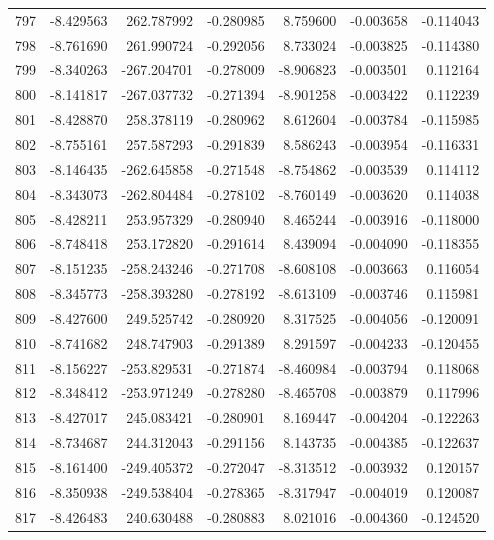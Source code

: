 \begin{tabular}{rrrrrrr}
 797 &  -8.429563 &  262.787992 & -0.280985 &    8.759600 &   -0.003658 & -0.114043 \\
 798 &  -8.761690 &  261.990724 & -0.292056 &    8.733024 &   -0.003825 & -0.114380 \\
 799 &  -8.340263 & -267.204701 & -0.278009 &   -8.906823 &   -0.003501 &  0.112164 \\
 800 &  -8.141817 & -267.037732 & -0.271394 &   -8.901258 &   -0.003422 &  0.112239 \\
 801 &  -8.428870 &  258.378119 & -0.280962 &    8.612604 &   -0.003784 & -0.115985 \\
 802 &  -8.755161 &  257.587293 & -0.291839 &    8.586243 &   -0.003954 & -0.116331 \\
 803 &  -8.146435 & -262.645858 & -0.271548 &   -8.754862 &   -0.003539 &  0.114112 \\
 804 &  -8.343073 & -262.804484 & -0.278102 &   -8.760149 &   -0.003620 &  0.114038 \\
 805 &  -8.428211 &  253.957329 & -0.280940 &    8.465244 &   -0.003916 & -0.118000 \\
 806 &  -8.748418 &  253.172820 & -0.291614 &    8.439094 &   -0.004090 & -0.118355 \\
 807 &  -8.151235 & -258.243246 & -0.271708 &   -8.608108 &   -0.003663 &  0.116054 \\
 808 &  -8.345773 & -258.393280 & -0.278192 &   -8.613109 &   -0.003746 &  0.115981 \\
 809 &  -8.427600 &  249.525742 & -0.280920 &    8.317525 &   -0.004056 & -0.120091 \\
 810 &  -8.741682 &  248.747903 & -0.291389 &    8.291597 &   -0.004233 & -0.120455 \\
 811 &  -8.156227 & -253.829531 & -0.271874 &   -8.460984 &   -0.003794 &  0.118068 \\
 812 &  -8.348412 & -253.971249 & -0.278280 &   -8.465708 &   -0.003879 &  0.117996 \\
 813 &  -8.427017 &  245.083421 & -0.280901 &    8.169447 &   -0.004204 & -0.122263 \\
 814 &  -8.734687 &  244.312043 & -0.291156 &    8.143735 &   -0.004385 & -0.122637 \\
 815 &  -8.161400 & -249.405372 & -0.272047 &   -8.313512 &   -0.003932 &  0.120157 \\
 816 &  -8.350938 & -249.538404 & -0.278365 &   -8.317947 &   -0.004019 &  0.120087 \\
 817 &  -8.426483 &  240.630488 & -0.280883 &    8.021016 &   -0.004360 & -0.124520 \\

\end{tabular}
